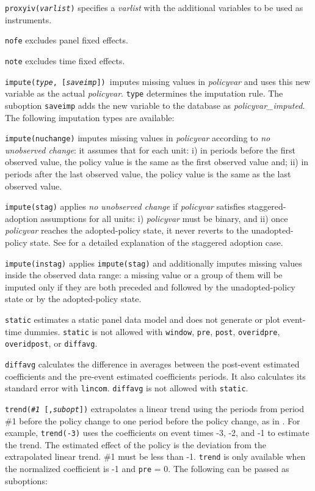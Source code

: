 \documentclass[12pt]{article}
\begin{document}
\morehangpara
{\tt proxyiv({\it varlist})} specifies a \textit{varlist} with the additional variables to be used as instruments.

\hangpara
{\tt nofe} excludes panel fixed effects.

\hangpara
{\tt note} excludes time fixed effects.

\hangpara
{\tt impute({\it type}, [{\it saveimp}]) }imputes missing values in {\it policyvar} and uses this new variable as the actual {\it policyvar}. {\tt type} determines the imputation rule. The suboption {\tt saveimp} adds the new variable to the database as {\it policyvar\_imputed}.
The following imputation types are available:

\morehangpara
{\tt impute(nuchange)} imputes missing values in {\it policyvar} according to {\it no unobserved change}: it assumes that for each unit: i) in periods before the first observed value, the policy value is the same as the first observed value and; ii) in periods after the last observed value, the policy value is the same as the last observed value.

\morehangpara
{\tt impute(stag)} applies {\it no unobserved change} if {\it policyvar} satisfies staggered-adoption assumptions for all units: i) {\it policyvar} must be binary, and ii) once {\it policyvar} reaches the adopted-policy state, it never reverts to the unadopted-policy state.
See \citet{freyaldenhoven2021visualization} for a detailed explanation of the staggered adoption case.

\morehangpara
{\tt impute(instag)} applies {\tt impute(stag)} and additionally imputes missing values inside the observed data range: a missing value or a group of them will be imputed only if they are both preceded and followed by the unadopted-policy state or by the adopted-policy state.

\hangpara
{\tt static} estimates a static panel data model and does not generate or plot event-time dummies.
{\tt static} is not allowed with {\tt window}, {\tt pre}, {\tt post}, {\tt overidpre}, {\tt overidpost}, or {\tt diffavg}.

\hangpara
{\tt diffavg} calculates the difference in averages between the post-event estimated coefficients and the pre-event estimated coefficients periods.
It also calculates its standard error with {\tt lincom}. {\tt diffavg} is not allowed with {\tt static}.

\hangpara
{\tt trend({\it \#1} [,{\it subopt}])} extrapolates a linear trend using the periods from period \#1 before the policy change to one period before the policy change, as in \citet{dobkin2018economic}.
For example, {\tt trend(-3)} uses the coefficients on event times -3, -2, and -1 to estimate the trend.
The estimated effect of the policy is the deviation from the extrapolated linear trend.
\#1 must be less than  -1.
{\tt trend} is only available when the normalized coefficient is -1 and {\tt pre} = 0.
The following can be passed as suboptions:
\end{document}
